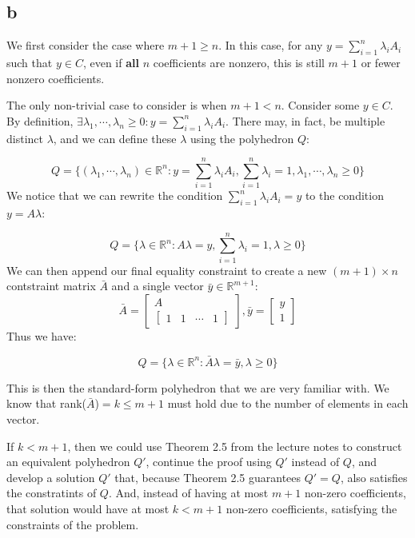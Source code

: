 \documentclass[11pt]{article}
\begin{document}
\subsection{b}

We first consider the case where $m+1\geq n$. In this case, for any $y=\sum_{i=1}^n\lambda_iA_i$ such that $y\in C$, even if \textbf{all} $n$ coefficients are nonzero, this is still $m+1$ or fewer nonzero coefficients.

The only non-trivial case to consider is when $m+1<n$. Consider some $y\in C$. By definition, $\exists \lambda_1, \cdots, \lambda_n\geq 0:y=\sum_{i=1}^n\lambda_i A_i$. There may, in fact, be multiple distinct $\lambda$, and we can define these $\lambda$ using the polyhedron $Q$:

$$
Q=\bigl\{(\lambda_1, \cdots,\lambda_n)\in\mathbb{R}^n:y=\sum_{i=1}^n\lambda_iA_i, \sum_{i=1}^n\lambda_i=1, \lambda_1, \cdots, \lambda_n \geq 0\bigr\}
$$
We notice that we can rewrite the condition $\sum_{i=1}^n\lambda_iA_i=y$ to the condition $y=A\lambda$:

$$
Q=\bigl\{\lambda\in\mathbb{R}^n:A\lambda=y, \sum_{i=1}^n\lambda_i=1, \lambda\geq 0\bigr\}
$$
We can then append our final equality constraint to create a new $(m+1)\times n$ contstraint matrix $\bar{A}$ and a single vector $\bar{y}\in\mathbb{R}^{m+1}$:
$$
\bar{A}=\begin{bmatrix}
A\\
\begin{bmatrix}
1&1&\cdots&1
\end{bmatrix}
\end{bmatrix}, 
\bar{y} = \begin{bmatrix}
y\\
1
\end{bmatrix}
$$
Thus we have:

$$
Q=\bigl\{\lambda\in\mathbb{R}^n:\bar{A}\lambda=\bar{y}, \lambda\geq 0\bigr\}
$$

This is then the standard-form polyhedron that we are very familiar with. We know that rank($\bar{A}$)$=k\leq m+1$ must hold due to the number of elements in each vector. 

If $k<m+1$, then we could use Theorem 2.5 from the lecture notes to construct an equivalent polyhedron $Q'$, continue the proof using $Q'$ instead of $Q$, and develop a solution $Q'$ that, because Theorem 2.5 guarantees $Q'=Q$, also satisfies the constratints of $Q$. And, instead of having at most $m+1$ non-zero coefficients, that solution would have at most $k<m+1$ non-zero coefficients, satisfying the constraints of the problem. 
\end{document}
